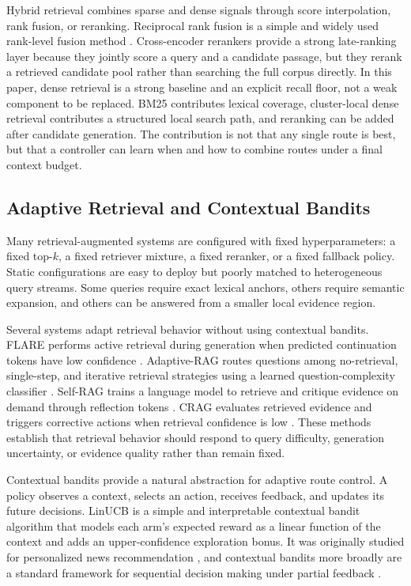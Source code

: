 Hybrid retrieval combines sparse and dense signals through score interpolation, rank fusion, or reranking. Reciprocal rank fusion is a simple and widely used rank-level fusion method \citep{cormack2009rrf}. Cross-encoder rerankers provide a strong late-ranking layer because they jointly score a query and a candidate passage, but they rerank a retrieved candidate pool rather than searching the full corpus directly. In this paper, dense retrieval is a strong baseline and an explicit recall floor, not a weak component to be replaced. BM25 contributes lexical coverage, cluster-local dense retrieval contributes a structured local search path, and reranking can be added after candidate generation. The contribution is not that any single route is best, but that a controller can learn when and how to combine routes under a final context budget.

\subsection{Adaptive Retrieval and Contextual Bandits}
\label{sec:03-related-work:adaptive-retrieval-and-contextual-bandits}

Many retrieval-augmented systems are configured with fixed hyperparameters: a fixed top-$k$, a fixed retriever mixture, a fixed reranker, or a fixed fallback policy. Static configurations are easy to deploy but poorly matched to heterogeneous query streams. Some queries require exact lexical anchors, others require semantic expansion, and others can be answered from a smaller local evidence region.

Several systems adapt retrieval behavior without using contextual bandits. FLARE performs active retrieval during generation when predicted continuation tokens have low confidence \citep{jiang2023flare}. Adaptive-RAG routes questions among no-retrieval, single-step, and iterative retrieval strategies using a learned question-complexity classifier \citep{jeong2024adaptiverag}. Self-RAG trains a language model to retrieve and critique evidence on demand through reflection tokens \citep{asai2024selfrag}. CRAG evaluates retrieved evidence and triggers corrective actions when retrieval confidence is low \citep{yan2024crag}. These methods establish that retrieval behavior should respond to query difficulty, generation uncertainty, or evidence quality rather than remain fixed.

Contextual bandits provide a natural abstraction for adaptive route control. A policy observes a context, selects an action, receives feedback, and updates its future decisions. LinUCB is a simple and interpretable contextual bandit algorithm that models each arm's expected reward as a linear function of the context and adds an upper-confidence exploration bonus. It was originally studied for personalized news recommendation \citep{li2010linucb}, and contextual bandits more broadly are a standard framework for sequential decision making under partial feedback \citep{lattimore2020bandits}.

